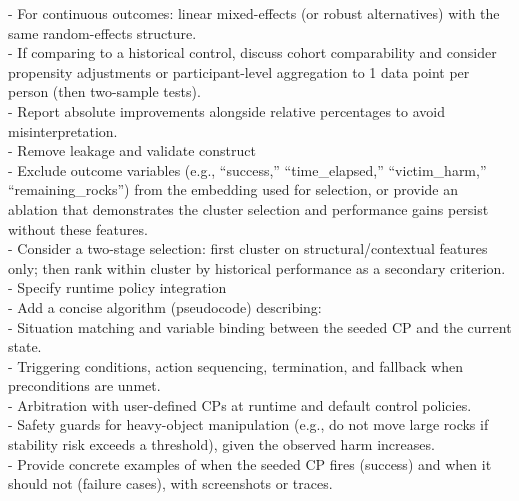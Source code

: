 \documentclass[letterpaper]{article} %
\begin{document}
\hspace*{2em}- For continuous outcomes: linear mixed-effects (or robust alternatives) with the same random-effects structure.\\
\hspace*{2em}- If comparing to a historical control, discuss cohort comparability and consider propensity adjustments or participant-level aggregation to 1 data point per person (then two-sample tests).\\
\hspace*{1em}- Report absolute improvements alongside relative percentages to avoid misinterpretation.\\[0.25em]
- Remove leakage and validate construct\\
\hspace*{1em}- Exclude outcome variables (e.g., “success,” “time\_elapsed,” “victim\_harm,” “remaining\_rocks”) from the embedding used for selection, or provide an ablation that demonstrates the cluster selection and performance gains persist without these features.\\
\hspace*{1em}- Consider a two-stage selection: first cluster on structural/contextual features only; then rank within cluster by historical performance as a secondary criterion.\\[0.25em]
- Specify runtime policy integration\\
\hspace*{1em}- Add a concise algorithm (pseudocode) describing:\\
\hspace*{2em}- Situation matching and variable binding between the seeded CP and the current state.\\
\hspace*{2em}- Triggering conditions, action sequencing, termination, and fallback when preconditions are unmet.\\
\hspace*{2em}- Arbitration with user-defined CPs at runtime and default control policies.\\
\hspace*{2em}- Safety guards for heavy-object manipulation (e.g., do not move large rocks if stability risk exceeds a threshold), given the observed harm increases.\\
\hspace*{1em}- Provide concrete examples of when the seeded CP fires (success) and when it should not (failure cases), with screenshots or traces.\\[0.25em]
\end{document}
